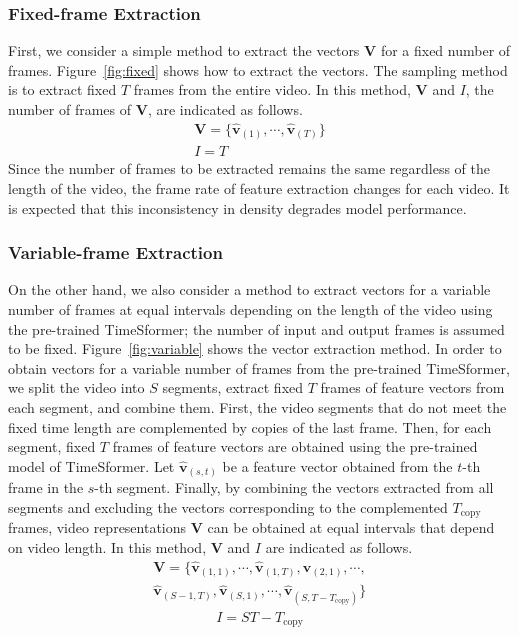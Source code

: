 \documentclass[letterpaper]{article} %
\begin{document}
\subsubsection{Fixed-frame Extraction}
% 
First, we consider a simple method to extract the vectors $\bm{V}$ for a fixed number of frames.
Figure~\ref{fig:fixed} shows how to extract the vectors.
% 
The sampling method is to extract fixed $T$ frames from the entire video.
In this method, $\bm{V}$ and $I$, the number of frames of $\bm{V}$, are indicated as follows.
\begin{gather}
    \bm{V} = \{\bm{\hat{v}}_{(1)}, \cdots , \bm{\hat{v}}_{(T)}\} \\ 
    I = T
\end{gather}
% 
Since the number of frames to be extracted remains the same regardless of the length of the video, the frame rate of feature extraction changes for each video.
% 
It is expected that this inconsistency in density degrades model performance.

\subsubsection{Variable-frame Extraction}
% 
On the other hand, we also consider a method to extract vectors for a variable number of frames at equal intervals depending on the length of the video using the pre-trained TimeSformer; the number of input and output frames is assumed to be fixed.
Figure~\ref{fig:variable} shows the vector extraction method.
% 
In order to obtain vectors for a variable number of frames from the pre-trained TimeSformer, we split the video into $S$ segments, extract fixed $T$ frames of feature vectors from each segment, and combine them.
% 
% 
First, the video segments that do not meet the fixed time length are complemented by copies of the last frame.
Then, for each segment, fixed $T$ frames of feature vectors are obtained using the pre-trained model of TimeSformer.
Let $\bm{\hat{v}}_{(s,t)}$ be a feature vector obtained from the $t$-th frame in the $s$-th segment.
% 
Finally, by combining the vectors extracted from all segments and excluding the vectors corresponding to the complemented $T_{\textrm{copy}}$ frames, video representations $\bm{V}$ can be obtained at equal intervals that depend on video length.
In this method, $\bm{V}$ and $I$ are indicated as follows.
\begin{multline}
    \bm{V} = \{\bm{\hat{v}}_{(1,1)}, \cdots , \bm{\hat{v}}_{(1,T)}, \bm{\hat{v}}_{(2,1)}, \cdots ,\\ \bm{\hat{v}}_{(S-1,T)}, \bm{\hat{v}}_{(S,1)}, \cdots , \bm{\hat{v}}_{(S,T-T_{\textrm{copy}})}\}    
\end{multline}
\begin{gather}
    I = ST - T_{\textrm{copy}}
\end{gather}
\end{document}
